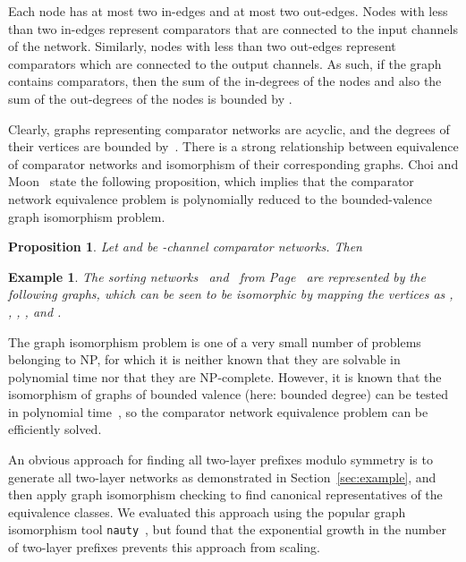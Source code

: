\documentclass[10pt]{IEEEtran}
\newtheorem{proposition}{Proposition}
\newtheorem{example}{Example}
\begin{document}
{{Each node has at most two in-edges and at most two out-edges. Nodes
with less than two in-edges represent comparators that are connected
to the input channels of the network. Similarly, nodes with less than two
out-edges represent comparators which are connected to the output
channels. As such, if the graph contains  comparators, then the sum of
the in-degrees of the nodes and also the sum of the out-degrees of the
nodes is bounded by .

Clearly, graphs representing comparator networks are acyclic, and the
degrees of their vertices are bounded by~.  There is a strong
relationship between equivalence of comparator networks and
isomorphism of their corresponding graphs. Choi and
Moon~\cite{DBLP:conf/gecco/ChoiM02} state the following proposition,
which implies that the comparator network equivalence problem is
polynomially reduced to the bounded-valence graph isomorphism problem.

\begin{proposition}\label{proposition:isomorphism}
  Let  and  be -channel comparator networks. Then

\end{proposition}


\begin{example}
  The sorting networks~ and~ from Page~\pageref{ex:sn} are
  represented by the following graphs,
  which can be seen to be isomorphic by mapping the vertices as
, , , ,  and
.

{\small 


}
\end{example}

The graph isomorphism problem is one of a very small number of
problems belonging to NP, for which it is neither known that they are solvable in
polynomial time nor that they are NP-complete.  However, it is known that
the isomorphism of graphs of bounded valence (here: bounded degree) can be tested in
polynomial time~\cite{DBLP:journals/jcss/Luks82}, so the comparator
network equivalence problem can be efficiently solved.

An obvious approach for finding all two-layer prefixes modulo symmetry
is to generate all two-layer networks as demonstrated in
Section~\ref{sec:example}, and then apply graph isomorphism checking to find
canonical representatives of the equivalence classes. 
We evaluated this approach using the popular graph isomorphism tool
\verb!nauty!~\cite{DBLP:journals/jsc/McKayP14}, but found that the
exponential growth in the number of two-layer prefixes prevents this
approach from scaling.

}}
\end{document}

